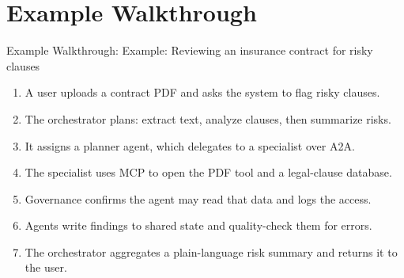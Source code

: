 \documentclass[10pt]{beamer}
\begin{document}
\section{Example Walkthrough}
\begin{frame}[allowframebreaks]{Example Walkthrough: Example: Reviewing an insurance contract for risky clauses}
\begin{enumerate}
  \item A user uploads a contract PDF and asks the system to flag risky clauses.
  \item The orchestrator plans: extract text, analyze clauses, then summarize risks.
  \item It assigns a planner agent, which delegates to a specialist over A2A.
  \item The specialist uses MCP to open the PDF tool and a legal-clause database.
  \item Governance confirms the agent may read that data and logs the access.
  \item Agents write findings to shared state and quality-check them for errors.
  \item The orchestrator aggregates a plain-language risk summary and returns it to the user.
\end{enumerate}
\end{frame}
\end{document}
